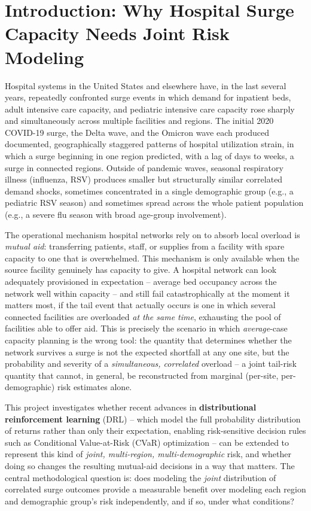 \documentclass[11pt]{article}
\begin{document}
\section{Introduction: Why Hospital Surge Capacity Needs Joint Risk Modeling}

Hospital systems in the United States and elsewhere have, in the last several years, repeatedly confronted surge events in which demand for inpatient beds, adult intensive care capacity, and pediatric intensive care capacity rose sharply and simultaneously across multiple facilities and regions. The initial 2020 COVID-19 surge, the Delta wave, and the Omicron wave each produced documented, geographically staggered patterns of hospital utilization strain, in which a surge beginning in one region predicted, with a lag of days to weeks, a surge in connected regions. Outside of pandemic waves, seasonal respiratory illness (influenza, RSV) produces smaller but structurally similar correlated demand shocks, sometimes concentrated in a single demographic group (e.g., a pediatric RSV season) and sometimes spread across the whole patient population (e.g., a severe flu season with broad age-group involvement).

The operational mechanism hospital networks rely on to absorb local overload is \emph{mutual aid}: transferring patients, staff, or supplies from a facility with spare capacity to one that is overwhelmed. This mechanism is only available when the source facility genuinely has capacity to give. A hospital network can look adequately provisioned in expectation -- average bed occupancy across the network well within capacity -- and still fail catastrophically at the moment it matters most, if the tail event that actually occurs is one in which several connected facilities are overloaded \emph{at the same time}, exhausting the pool of facilities able to offer aid. This is precisely the scenario in which \emph{average}-case capacity planning is the wrong tool: the quantity that determines whether the network survives a surge is not the expected shortfall at any one site, but the probability and severity of a \emph{simultaneous, correlated} overload -- a joint tail-risk quantity that cannot, in general, be reconstructed from marginal (per-site, per-demographic) risk estimates alone.

This project investigates whether recent advances in \textbf{distributional reinforcement learning} (DRL) -- which model the full probability distribution of returns rather than only their expectation, enabling risk-sensitive decision rules such as Conditional Value-at-Risk (CVaR) optimization -- can be extended to represent this kind of \emph{joint, multi-region, multi-demographic} risk, and whether doing so changes the resulting mutual-aid decisions in a way that matters. The central methodological question is: does modeling the \emph{joint} distribution of correlated surge outcomes provide a measurable benefit over modeling each region and demographic group's risk independently, and if so, under what conditions?
\end{document}
